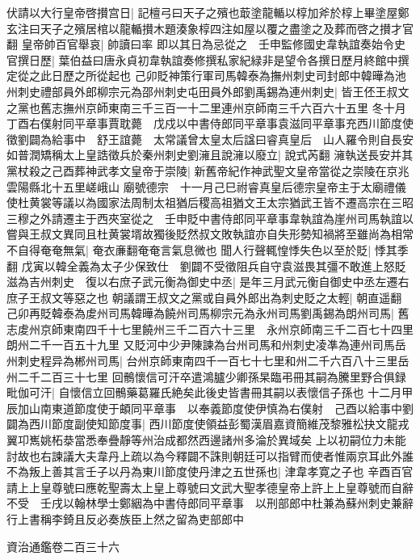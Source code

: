 伏請以大行皇帝啓攅宫日|{
	記檀弓曰天子之殯也菆塗龍輴以椁加斧於椁上畢塗屋鄭玄注曰天子之殯居棺以龍輴攅木題湊象椁四注如屋以覆之盡塗之及葬而啓之攅才官翻}
皇帝帥百官舉哀|{
	帥讀曰率}
即以其日為忌從之　壬申監修國史韋執誼奏始令史官撰日歷|{
	葉伯益曰唐永貞初韋執誼奏修撰私家紀緑非是望令各撰日歷月終館中撰定從之此日歷之所從起也}
己卯貶神策行軍司馬韓泰為撫州刺史司封郎中韓曄為池州刺史禮部員外郎柳宗元為邵州刺史屯田員外郎劉禹錫為連州刺史|{
	皆王伾王叔文之黨也舊志撫州京師東南三千三百一十二里連州京師南三千六百六十五里}
冬十月丁酉右僕射同平章事賈耽薨　戊戍以中書侍郎同平章事袁滋同平章事充西川節度使徵劉闢為給事中　舒王誼薨　太常議曾太皇太后諡曰睿真皇后　山人羅令則自長安如普潤矯稱太上皇誥徵兵於秦州刺史劉澭且說澭以廢立|{
	說式芮翻}
澭執送長安并其黨杖殺之己酉葬神武孝文皇帝于崇陵|{
	新舊帝紀作神武聖文皇帝當從之崇陵在京兆雲陽縣北十五里嵯峨山}
廟號德宗　十一月己巳祔睿真皇后德宗皇帝主于太廟禮儀使杜黄裳等議以為國家法周制太祖猶后稷高祖猶文王太宗猶武王皆不遷高宗在三昭三穆之外請遷主于西夾室從之　壬申貶中書侍郎同平章事韋執誼為崖州司馬執誼以嘗與王叔文異同且杜黄裳壻故獨後貶然叔文敗執誼亦自失形勢知禍將至雖尚為相常不自得奄奄無氣|{
	奄衣亷翻奄奄言氣息微也}
聞人行聲輒惶悸失色以至於貶|{
	悸其季翻}
戊寅以韓全義為太子少保致仕　劉闢不受徵阻兵自守袁滋畏其彊不敢進上怒貶滋為吉州刺史　復以右庶子武元衡為御史中丞|{
	是年三月武元衡自御史中丞左遷右庶子王叔文等惡之也}
朝議謂王叔文之黨或自員外郎出為刺史貶之太輕|{
	朝直遥翻}
己卯再貶韓泰為䖍州司馬韓曄為饒州司馬柳宗元為永州司馬劉禹錫為朗州司馬|{
	舊志䖍州京師東南四千十七里饒州三千二百六十三里　永州京師南三千二百七十四里朗州二千一百五十九里}
又貶河中少尹陳諫為台州司馬和州刺史凌凖為連州司馬岳州刺史程异為郴州司馬|{
	台州京師東南四千一百七十七里和州二千六百八十三里岳州二千二百三十七里}
回鶻懷信可汗卒遣鴻臚少卿孫杲臨弔冊其嗣為騰里野合俱録毗伽可汗|{
	自懷信立回鶻藥葛羅氏絶矣此後史皆書冊其嗣以表懷信子孫也}
十二月甲辰加山南東道節度使于頔同平章事　以奉義節度使伊慎為右僕射　己酉以給事中劉闢為西川節度副使知節度事|{
	西川節度使領益彭蜀漢眉嘉資簡維茂黎雅松抉文龍戎翼卭嶲姚柘㳟當悉奉疊靜等州治成都然西邊諸州多淪於異域矣}
上以初嗣位力未能討故也右諫議大夫韋丹上疏以為今釋闢不誅則朝廷可以指臂而使者惟兩京耳此外誰不為叛上善其言壬子以丹為東川節度使丹津之五世孫也|{
	津韋孝寛之子也}
辛酉百官請上上皇尊號曰應乾聖壽太上皇上尊號曰文武大聖孝德皇帝上許上上皇尊號而自辭不受　壬戌以翰林學士鄭絪為中書侍郎同平章事　以刑部郎中杜兼為蘇州刺史兼辭行上書稱李錡且反必奏族臣上然之留為吏部郎中

資治通鑑卷二百三十六
